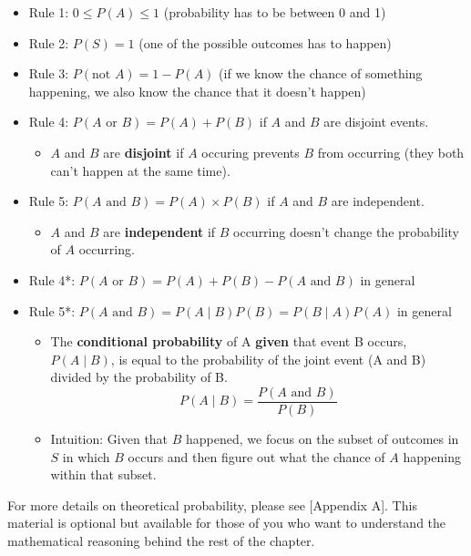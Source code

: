 \documentclass[
]{book}
\providecommand{\tightlist}{%
  \setlength{\itemsep}{0pt}\setlength{\parskip}{0pt}}
\begin{document}
\begin{itemize}
\tightlist
\item
  Rule 1: \(0\leq P(A)\leq 1\) (probability has to be between 0 and 1)
\item
  Rule 2: \(P(S) = 1\) (one of the possible outcomes has to happen)
\item
  Rule 3: \(P(\text{not }A) = 1 - P(A)\) (if we know the chance of something happening, we also know the chance that it doesn't happen)
\item
  Rule 4: \(P(A\text{ or }B) = P(A) + P(B)\) if \(A\) and \(B\) are disjoint events.

  \begin{itemize}
  \tightlist
  \item
    \(A\) and \(B\) are \textbf{disjoint} if \(A\) occuring prevents \(B\) from occurring (they both can't happen at the same time).
  \end{itemize}
\item
  Rule 5: \(P(A\text{ and }B) = P(A)\times P(B)\) if \(A\) and \(B\) are independent.

  \begin{itemize}
  \tightlist
  \item
    \(A\) and \(B\) are \textbf{independent} if \(B\) occurring doesn't change the probability of \(A\) occurring.
  \end{itemize}
\item
  Rule 4*: \(P(A\text{ or }B) = P(A) + P(B) - P(A\text{ and } B)\) in general
\item
  Rule 5*: \(P(A\text{ and }B) = P(A \mid B)P(B) = P(B \mid A)P(A)\) in general

  \begin{itemize}
  \tightlist
  \item
    The \textbf{conditional probability} of A \textbf{given} that event B occurs, \(P(A \mid B)\), is equal to the probability of the joint event (A and B) divided by the probability of B.
    \[ P(A \mid B) = \frac{P(A \text{ and } B)}{P(B)} \]
  \item
    Intuition: Given that \(B\) happened, we focus on the subset of outcomes in \(S\) in which \(B\) occurs and then figure out what the chance of \(A\) happening within that subset.
  \end{itemize}
\end{itemize}

For more details on theoretical probability, please see {[}Appendix A{]}. This material is optional but available for those of you who want to understand the mathematical reasoning behind the rest of the chapter.
\end{document}
